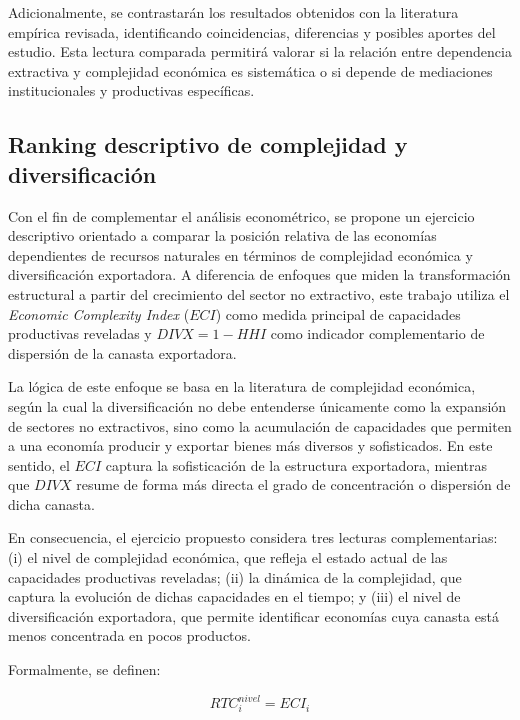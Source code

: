 \documentclass[../../PTFM.tex]{subfiles}
\begin{document}
	Adicionalmente, se contrastarán los resultados obtenidos con la literatura empírica revisada, identificando coincidencias, diferencias y posibles aportes del estudio. Esta lectura comparada permitirá valorar si la relación entre dependencia extractiva y complejidad económica es sistemática o si depende de mediaciones institucionales y productivas específicas.



	\subsection{Ranking descriptivo de complejidad y diversificación}
	\label{subsec:ranking}

	Con el fin de complementar el análisis econométrico, se propone un ejercicio descriptivo orientado a comparar la posición relativa de las economías dependientes de recursos naturales en términos de complejidad económica y diversificación exportadora. A diferencia de enfoques que miden la transformación estructural a partir del crecimiento del sector no extractivo, este trabajo utiliza el \textit{Economic Complexity Index} ($ECI$) como medida principal de capacidades productivas reveladas y $DIVX=1-HHI$ como indicador complementario de dispersión de la canasta exportadora.

	La lógica de este enfoque se basa en la literatura de complejidad económica, según la cual la diversificación no debe entenderse únicamente como la expansión de sectores no extractivos, sino como la acumulación de capacidades que permiten a una economía producir y exportar bienes más diversos y sofisticados. En este sentido, el $ECI$ captura la sofisticación de la estructura exportadora, mientras que $DIVX$ resume de forma más directa el grado de concentración o dispersión de dicha canasta.

	En consecuencia, el ejercicio propuesto considera tres lecturas complementarias: (i) el nivel de complejidad económica, que refleja el estado actual de las capacidades productivas reveladas; (ii) la dinámica de la complejidad, que captura la evolución de dichas capacidades en el tiempo; y (iii) el nivel de diversificación exportadora, que permite identificar economías cuya canasta está menos concentrada en pocos productos.

	Formalmente, se definen:

	\begin{equation}
		RTC_i^{nivel} = ECI_i
	\end{equation}
\end{document}

